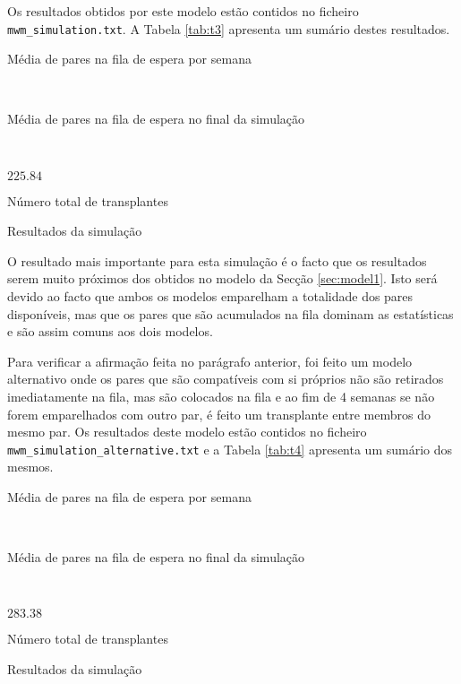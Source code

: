 \documentclass[10pt,a4paper,oneside]{article}
\begin{document}
Os resultados obtidos por este modelo estão contidos no ficheiro
\texttt{mwm\_simulation.txt}. A Tabela \ref{tab:t3} apresenta um
sumário destes resultados.

\begin{table}[h]
  \centering
  \begin{subtable}[h]{0.3\textwidth}
    \caption{Média de pares na fila de espera por semana}
  \end{subtable}
  ~
  \begin{subtable}[h]{0.3\textwidth}
    \caption{Média de pares na fila de espera no final da simulação}
  \end{subtable}
  ~
  \begin{subtable}[h]{0.3\textwidth}
    \centering
    $225.84$
    \caption{Número total de transplantes}
  \end{subtable}

  \caption{Resultados da simulação}
  \label{tab:t3}
\end{table}

O resultado mais importante para esta simulação é o facto que os
resultados serem muito próximos dos obtidos no modelo da Secção
\ref{sec:model1}. Isto será devido ao facto que ambos os modelos
emparelham a totalidade dos pares disponíveis, mas que os pares que
são acumulados na fila dominam as estatísticas e são assim comuns aos
dois modelos.

Para verificar a afirmação feita no parágrafo anterior, foi feito um
modelo alternativo onde os pares que são compatíveis com si próprios
não são retirados imediatamente na fila, mas são colocados na fila e
ao fim de 4 semanas se não forem emparelhados com outro par, é feito
um transplante entre membros do mesmo par. Os resultados deste modelo
estão contidos no ficheiro \texttt{mwm\_simulation\_alternative.txt} e
a Tabela \ref{tab:t4} apresenta um sumário dos mesmos.

\begin{table}[h]
  \centering
  \begin{subtable}[h]{0.3\textwidth}
    \caption{Média de pares na fila de espera por semana}
  \end{subtable}
  ~
  \begin{subtable}[h]{0.3\textwidth}
    \caption{Média de pares na fila de espera no final da simulação}
  \end{subtable}
  ~
  \begin{subtable}[h]{0.3\textwidth}
    \centering
    $283.38$
    \caption{Número total de transplantes}
  \end{subtable}

  \caption{Resultados da simulação}
  \label{tab:t4}
\end{table}
\end{document}
